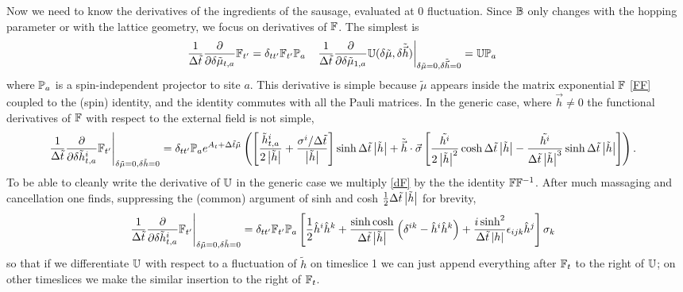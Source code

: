 Now we need to know the derivatives of the ingredients of the sausage, evaluated at 0 fluctuation.
Since $\mathbb{B}$ only changes with the hopping parameter or with the lattice geometry, we focus on derivatives of $\mathbb{F}$.
The simplest is
\begin{align}
	\frac{1}{\Delta\tilde{t}} \frac{\partial}{\partial \delta\tilde{\mu}_{t,a}} \mathbb{F}_{t'} &= \delta_{tt'} \mathbb{F}_{t'} \mathbb{P}_a
	&
	\left.\frac{1}{\Delta\tilde{t}} \frac{\partial}{\partial \delta\tilde{\mu}_{1,a}} \mathbb{U}(\delta\tilde{\mu}, \delta\tilde{\vec{h}})\right|_{\delta\tilde{\mu}=0, \delta\tilde{\vec{h}}=0}
	&= \mathbb{U} \mathbb{P}_a
\end{align}
where $\mathbb{P}_a$ is a spin-independent projector to site $a$.
This derivative is simple because $\tilde{\mu}$ appears inside the matrix exponential $\mathbb{F}$ \eqref{FF} coupled to the (spin) identity, and the identity commutes with all the Pauli matrices.
In the generic case, where $\vec{h}\neq0$ the functional derivatives of $\mathbb{F}$ with respect to the external field is not simple,
\begin{align}
	\left.\frac{1}{\Delta\tilde{t}}\frac{\partial}{\partial \delta \tilde{h}^i_{t,a}} \mathbb{F}_{t'}\right|_{\delta\tilde{\mu} = 0, \delta \tilde{h}=0}
	&=
	\delta_{tt'}\mathbb{P}_a e^{A_t + \Delta\tilde{t}\tilde{\mu}}\left(
		\left[\frac{\tilde{h}^i_{t,a}}{2 \left| \tilde{h} \right|} + \frac{\sigma^i/\Delta\tilde{t}}{\left| \tilde{h} \right|}\right]\sinh \Delta\tilde{t}\left| \tilde{h} \right|
		+
		\tilde{\vec{h}}\cdot\vec{\sigma} \left[
				\frac{\tilde{h^i}}{2 \left| \tilde{h} \right|^2} \cosh \Delta\tilde{t} \left| \tilde{h} \right|
			-	\frac{\tilde{h^i}}{\Delta\tilde{t} \left| \tilde{h} \right|^{3}} \sinh \Delta\tilde{t} \left| \tilde{h} \right|
		\right]
	\right).
	\label{eq:dF}
\end{align}
To be able to cleanly write the derivative of $\mathbb{U}$ in the generic case we multiply \eqref{dF} by the the identity $\mathbb{F}\mathbb{F}^{-1}$.
After much massaging and cancellation one finds, suppressing the (common) argument of sinh and cosh $\frac{1}{2}\Delta\tilde{t}\left| \tilde{h} \right|$ for brevity,
\begin{align}
	\left.\frac{1}{\Delta\tilde{t}}\frac{\partial}{\partial \delta \tilde{h}^i_{t,a}} \mathbb{F}_{t'}\right|_{\delta\tilde{\mu} = 0, \delta \tilde{h}=0}
	&= \delta_{tt'} \mathbb{F}_{t'} \mathbb{P}_a \left[
				\frac{1}{2} \hat{h}^i \hat{h}^k
			+	\frac{\sinh \cosh}{\Delta\tilde{t} \left| \tilde{h} \right|} \left(\delta^{ik}-\hat{h}^i\hat{h}^k\right)
			+	\frac{i \sinh^2}{\Delta\tilde{t} \left| h \right|} \epsilon_{ijk} \hat{h}^j
		\right]\sigma_k
	\label{eq:dFdh factor}
\end{align}
so that if we differentiate $\mathbb{U}$ with respect to a fluctuation of $\tilde{h}$ on timeslice 1 we can just append everything after $\mathbb{F}_t$ to the right of $\mathbb{U}$; on other timeslices we make the similar insertion to the right of $\mathbb{F}_t$.
